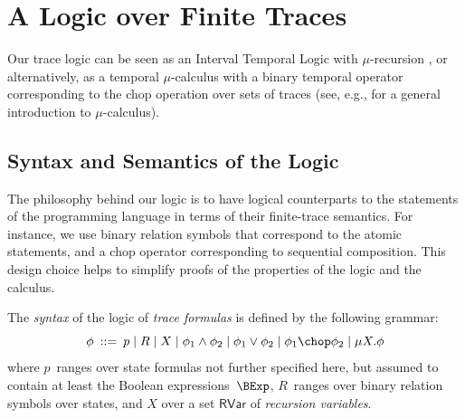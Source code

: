 \documentclass[a4paper,numberwithinsect]{lipics-v2021}
\newcommand{\rh}[1]{\marginpar{RH: #1}}
\begin{document}
\section{A Logic over Finite Traces}
\label{sec:logic-traces}

Our trace logic can be seen as an Interval Temporal Logic
\cite{HalpernShoham91} with $\mu$-recursion \cite{Park76}, or
alternatively, as a temporal $\mu$-calculus with a binary temporal
operator corresponding to the chop operation over sets of traces (see,
e.g., \cite{sti-93-handbook-chapter} for a general introduction to
$\mu$-calculus).


\subsection{Syntax and Semantics of the Logic}

The philosophy behind our logic is to have logical counterparts to 
the statements of the programming language in terms of their 
finite-trace semantics. 
%
For instance, we use binary relation symbols that correspond to the
atomic statements, and a chop operator corresponding to sequential 
composition.
%
This design choice helps to simplify proofs of the properties of the
logic and the calculus.

\begin{definition}
\label{def:logic-syntax}
The \emph{syntax} of the logic of \emph{trace formulas} is defined by
the following grammar:
%
$$ \phi \>::=\> p \mid
                R \mid 
                X \mid 
                \phi_1 \wedge \phi_2 \mid 
                \phi_1 \vee \phi_2 \mid 
                \phi_1 \chop \phi_2 \mid 
                \mu X. \phi
$$
%
where $p$~ranges over state formulas not further specified here, but
assumed to contain at least the Boolean expressions~$\BExp$,
$R$~ranges over binary relation symbols over states, and $X$ over a
set $\mathsf{RVar}$ of \emph{recursion variables}.
\end{definition}
\end{document}

